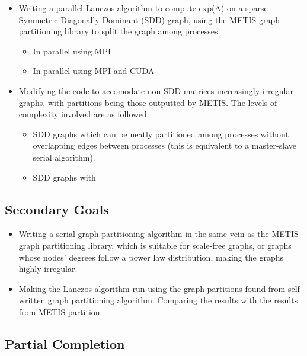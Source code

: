 \documentclass[a4paper, fleqn]{article}
\begin{document}
\begin{itemize}
        \item Writing a parallel Lanczos algorithm to compute exp(A) on a sparse Symmetric Diagonally Dominant (SDD) graph, using the METIS graph partitioning library to split the graph among processes.
                \begin{itemize}
                        \item In parallel using MPI
                        \item In parallel using MPI and CUDA
                \end{itemize}
        \item Modifying the code to accomodate non SDD matrices increasingly irregular graphs, with partitions being those outputted by METIS. The levels of complexity involved are as followed:
                \begin{itemize}
                        \item SDD graphs which can be neatly partitioned among processes without overlapping edges between processes (this is equivalent to a master-slave serial algorithm).
                        \item SDD graphs with 
                \end{itemize}
\end{itemize}

\subsection*{Secondary Goals}%
\label{sub:subsection_name}


\begin{itemize}
        \item Writing a serial graph-partitioning algorithm in the same vein as the METIS graph partitioning library, which is suitable for scale-free graphs, or graphs whose nodes' degrees follow a power law distribution, making the graphs highly irregular.
        \item Making the Lanczos algorithm run using the graph partitions found from self-written graph partitioning algorithm. Comparing the results with the results from METIS partition.
\end{itemize}

\subsection*{Partial Completion}%
\label{sub:partial_completion}
\end{document}
